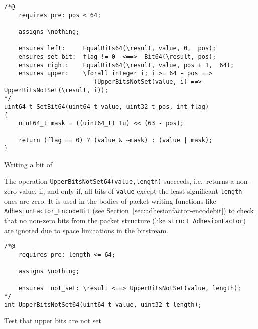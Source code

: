 \begin{listing}[hbt]
\begin{minipage}{0.99\textwidth}
\begin{lstlisting}[style=acsl-block]
/*@
    requires pre: pos < 64;

    assigns \nothing;

    ensures left:     EqualBits64(\result, value, 0,  pos);
    ensures set_bit:  flag != 0  <==>  Bit64(\result, pos);
    ensures right:    EqualBits64(\result, value, pos + 1,  64);
    ensures upper:    \forall integer i; i >= 64 - pos ==>
                         (UpperBitsNotSet(value, i) ==> UpperBitsNotSet(\result, i));
*/
uint64_t SetBit64(uint64_t value, uint32_t pos, int flag)
{
    uint64_t mask = ((uint64_t) 1u) << (63 - pos);

    return (flag == 0) ? (value & ~mask) : (value | mask);
}
\end{lstlisting}
\end{minipage}
\caption{\label{lst:SetBit64}Writing a bit of }
\end{listing}




The operation \lstinline{UpperBitsNotSet64(value,length)} succeeds,
i.e.\ returns a
non-zero value, if, and only if, all bits of \lstinline{value} except
the least significant
\lstinline{length} ones are zero.
%
It is used in the bodies of packet writing functions like
\lstinline{AdhesionFactor_EncodeBit} 
(see Section~\ref{sec:adhesionfactor-encodebit})
to check that no non-zero bits from the packet structure (like
\lstinline{struct AdhesionFactor}) are ignored due to space
limitations in the bitstream.





\begin{listing}[hbt]
\begin{minipage}{0.99\textwidth}
\begin{lstlisting}[style=acsl-block]
/*@
    requires pre: length <= 64;

    assigns \nothing;

    ensures  not_set: \result <==> UpperBitsNotSet(value, length);
*/
int UpperBitsNotSet64(uint64_t value, uint32_t length);
\end{lstlisting}
\end{minipage}
\caption{\label{lst:UpperBitsNotSet64}Test that upper bits are not set}
\end{listing}
%











